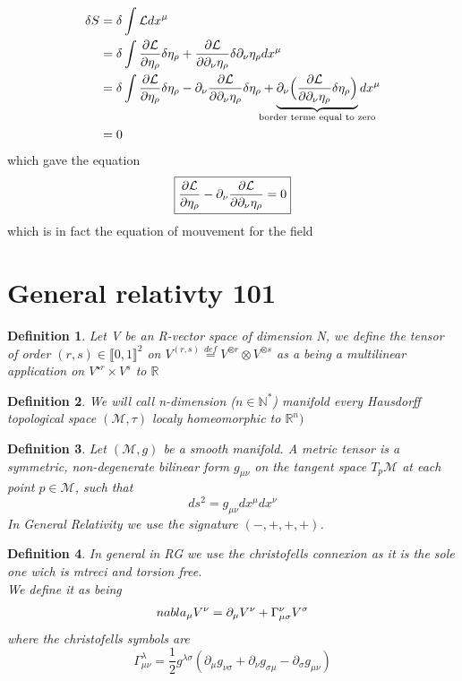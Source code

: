 \documentclass{article}
\newtheorem{definition}{Definition}
\begin{document}
\begin{align*}
    \delta S &= \delta \int \mathcal{L} dx^\mu \\
    & = \delta \int \pdv{\mathcal{L}}{\eta_{\rho}} \delta \eta_{\rho} + \pdv{\mathcal{L}}{\partial_{\nu}\eta_{\rho}} \delta \partial_ \nu \eta_{\rho}  dx^\mu\\
    & = \delta \int \pdv{\mathcal{L}}{\eta_{\rho}} \delta \eta_{\rho}- \partial_ \nu \pdv{\mathcal{L}}{\partial_{\nu}\eta_{\rho}} \delta  \eta_{\rho}  + \underbrace{\partial_ \nu \Big(\pdv{\mathcal{L}}{\partial_{\nu}\eta_{\rho}} \delta  \eta_{\rho}\Big)}_{\mathclap{\text{border terme equal to zero}}}  dx^\mu\\
    & = 0
\end{align*}
which gave the equation
\begin{equation}
    \boxed{\pdv{\mathcal{L}}{\eta_{\rho}} - \partial_ \nu \pdv{\mathcal{L}}{\partial_{\nu}\eta_{\rho}} = 0}
\end{equation}
which is in fact the equation of mouvement for the field\section{General relativty 101}
\begin{definition}
Let V be an R-vector space of dimension N, we define the tensor of order $(r,s) \in  \llbracket 0 ,1 \rrbracket^2$ on $V^{(r,s)} \overset{def}{=} V^{\otimes r} \otimes V^{\otimes s}$
as a being a multilinear application on $ V^{\star r} \times V^{ s}$ to $\mathbb{R}$
 \end{definition}

\begin{definition}
    We will call n-dimension ($n \in \mathbb{N}^*$) manifold every Hausdorff topological space $(\mathcal{M},\tau )$ localy homeomorphic to $\mathbb{R}^n)$
\end{definition}
\begin{definition}
    Let $(\mathcal{M}, g)$ be a smooth manifold. A metric tensor is a symmetric, 
    non-degenerate bilinear form $g_{\mu\nu}$ on the tangent space $T_p\mathcal{M}$ 
    at each point $p \in \mathcal{M}$, such that
    \begin{equation*}
        ds^2 = g_{\mu\nu} dx^\mu dx^\nu
    \end{equation*}
    In General Relativity we use the signature $(-,+,+,+)$.
\end{definition}
\begin{definition}
   In general in RG we use the christofells connexion as it is the sole one wich is mtreci and torsion free.\\
   We define it as being
   \begin{equation}
    \\nabla_{\mu}V^{\nu}= \partial_{\mu}V^{\nu}+\Gamma^{\nu}_{\mu \sigma}V^{\sigma}
   \end{equation} 
   where the christofells symbols are
   \begin{equation}
    \Gamma_{\mu \nu}^{\lambda} = \frac{1}{2}g^{\lambda \sigma}(\partial_{\mu}g_{\nu \sigma}+\partial_{\nu}g_{\sigma \mu} - \partial_{\sigma}g_{\mu \nu})
   \end{equation}
\end{definition}
\end{document}
